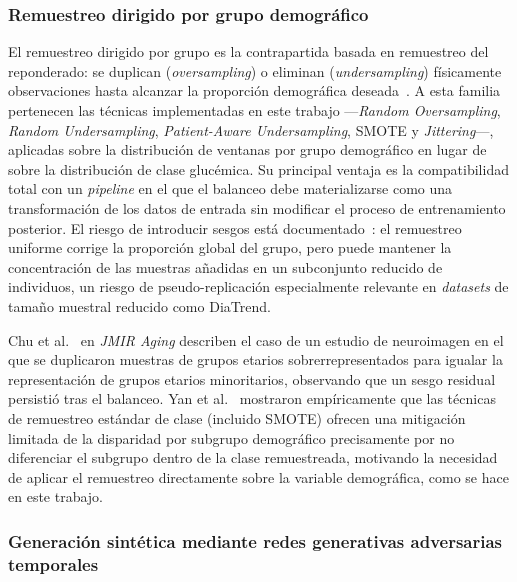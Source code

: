 \subsubsection{Remuestreo dirigido por grupo demográfico}
\label{subsec:group_resampling}

El remuestreo dirigido por grupo es la contrapartida basada en remuestreo del reponderado: se duplican (\emph{oversampling}) o eliminan (\emph{undersampling}) físicamente observaciones hasta alcanzar la proporción demográfica deseada~\cite{fairmodels2021,kamiran2012data}. A esta familia pertenecen las técnicas implementadas en este trabajo —\emph{Random Oversampling}, \emph{Random Undersampling}, \emph{Patient-Aware Undersampling}, SMOTE y \emph{Jittering}—, aplicadas sobre la distribución de ventanas por grupo demográfico en lugar de sobre la distribución de clase glucémica. Su principal ventaja es la compatibilidad total con un \emph{pipeline} en el que el balanceo debe materializarse como una transformación de los datos de entrada sin modificar el proceso de entrenamiento posterior. El riesgo de introducir sesgos está documentado~\cite{krasanakis2018reweighting,algorithmfairnessmedicine2021}: el remuestreo uniforme corrige la proporción global del grupo, pero puede mantener la concentración de las muestras añadidas en un subconjunto reducido de individuos, un riesgo de pseudo-replicación especialmente relevante en \emph{datasets} de tamaño muestral reducido como DiaTrend.

Chu et al.~\cite{chu2024agebias} en \emph{JMIR Aging} describen el caso de un estudio de neuroimagen en el que se duplicaron muestras de grupos etarios sobrerrepresentados para igualar la representación de grupos etarios minoritarios, observando que un sesgo residual persistió tras el balanceo. Yan et al.~\cite{yan2022doubleprioritized} mostraron empíricamente que las técnicas de remuestreo estándar de clase (incluido SMOTE) ofrecen una mitigación limitada de la disparidad por subgrupo demográfico precisamente por no diferenciar el subgrupo dentro de la clase remuestreada, motivando la necesidad de aplicar el remuestreo directamente sobre la variable demográfica, como se hace en este trabajo.

\subsubsection{Generación sintética mediante redes generativas adversarias temporales}
\label{subsec:timegan_demografico}

